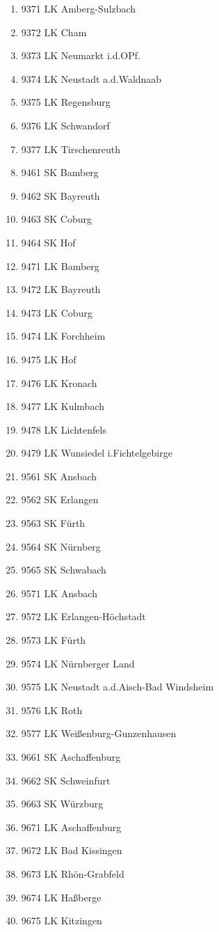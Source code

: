 \begin{enumerate}[itemsep=-6mm]
\item 9371 LK Amberg-Sulzbach
\item 9372 LK Cham
\item 9373 LK Neumarkt i.d.OPf.
\item 9374 LK Neustadt a.d.Waldnaab
\item 9375 LK Regensburg
\item 9376 LK Schwandorf
\item 9377 LK Tirschenreuth
\item 9461 SK Bamberg
\item 9462 SK Bayreuth
\item 9463 SK Coburg
\item 9464 SK Hof
\item 9471 LK Bamberg
\item 9472 LK Bayreuth
\item 9473 LK Coburg
\item 9474 LK Forchheim
\item 9475 LK Hof
\item 9476 LK Kronach
\item 9477 LK Kulmbach
\item 9478 LK Lichtenfels
\item 9479 LK Wunsiedel i.Fichtelgebirge
\item 9561 SK Ansbach
\item 9562 SK Erlangen
\item 9563 SK Fürth
\item 9564 SK Nürnberg
\item 9565 SK Schwabach
\item 9571 LK Ansbach
\item 9572 LK Erlangen-Höchstadt
\item 9573 LK Fürth
\item 9574 LK Nürnberger Land
\item 9575 LK Neustadt a.d.Aisch-Bad Windsheim
\item 9576 LK Roth
\item 9577 LK Weißenburg-Gunzenhausen
\item 9661 SK Aschaffenburg
\item 9662 SK Schweinfurt
\item 9663 SK Würzburg
\item 9671 LK Aschaffenburg
\item 9672 LK Bad Kissingen
\item 9673 LK Rhön-Grabfeld
\item 9674 LK Haßberge
\item 9675 LK Kitzingen

\end{enumerate}

